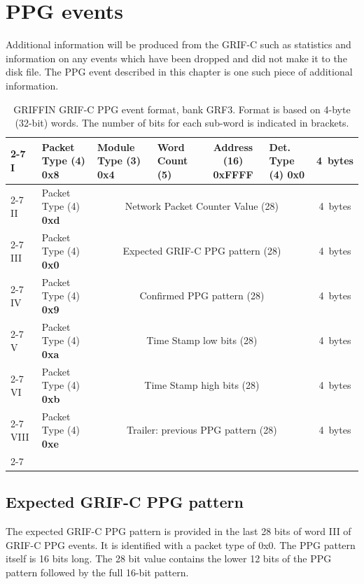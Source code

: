 \documentclass[letterpaper,12pt,notitlepage]{report}
\begin{document}

\chapter{PPG events}
\label{c.PPG}
Additional information will be produced from the GRIF-C such as statistics and information on any events which have been dropped and did not make it to the disk file. The PPG event described in this chapter is one such piece of additional information.

\begin{landscape}
\begin{table}
\caption{GRIFFIN GRIF-C PPG event format, bank GRF3. Format is based on 4-byte (32-bit) words. The number of bits for each sub-word is indicated in brackets.}
\begin{tabular*}{\textwidth}{p{0.7cm}|p{2.7cm}|p{2.7cm}|p{2.7cm}|p{2.7cm}|p{2.7cm}|p{2.7cm}|c}
\cline{2-7}
I & Packet Type (4) {\bf 0x8} & Module Type (3) {\bf 0x4} & Word Count (5) & \multicolumn{2}{c|}{Address (16) {\bf 0xFFFF}} & Det. Type (4) {\bf 0x0} & 4~bytes\\
\cline{2-7}
II & Packet Type (4) {\bf 0xd} & \multicolumn{5}{c|}{Network Packet Counter Value (28)} & 4~bytes\\
\cline{2-7}
III & Packet Type (4) {\bf 0x0} & \multicolumn{5}{c|}{Expected GRIF-C PPG pattern (28)} & 4~bytes\\
\cline{2-7}
IV & Packet Type (4) {\bf 0x9} & \multicolumn{5}{c|}{Confirmed PPG pattern (28)} & 4~bytes\\
\cline{2-7}
V & Packet Type (4) {\bf 0xa} & \multicolumn{5}{c|}{Time Stamp low bits (28)} & 4~bytes\\
\cline{2-7}
VI & Packet Type (4) {\bf 0xb} & \multicolumn{5}{c|}{Time Stamp high bits (28)} & 4~bytes\\
\cline{2-7}
VIII & Packet Type (4) {\bf 0xe} & \multicolumn{5}{c|}{Trailer: previous PPG pattern (28)} & 4~bytes\\
\cline{2-7}
\end{tabular*}
\end{table}
\end{landscape}

\section{Expected GRIF-C PPG pattern}
The expected GRIF-C PPG pattern is provided in the last 28 bits of word III of GRIF-C PPG events. It is identified with a packet type of 0x0. The PPG pattern itself is 16 bits long. The 28 bit value contains the lower 12 bits of the PPG pattern followed by the full 16-bit pattern.\\
\end{document}
